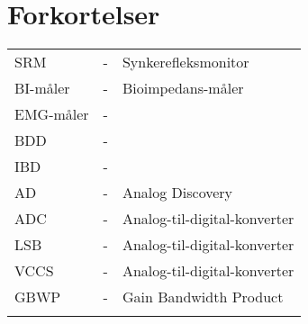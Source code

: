 \chapter{Forkortelser}

\begin{table}[H]
\center
{}
\begin{tabularx}{\linewidth}{l l X}	
SRM         & - &   Synkerefleksmonitor \\ \addlinespace[2mm]
BI-måler         & - &   Bioimpedans-måler \\ \addlinespace[2mm]
EMG-måler   & - &    \\ \addlinespace[2mm]
BDD   & - &    \\ \addlinespace[2mm]
IBD  & - &    \\ \addlinespace[2mm]
AD  & - &  Analog Discovery  \\ \addlinespace[2mm]
ADC  & - &  Analog-til-digital-konverter  \\ \addlinespace[2mm]
LSB  & - &  Analog-til-digital-konverter  \\ \addlinespace[2mm]
VCCS & - &  Analog-til-digital-konverter  \\ \addlinespace[2mm]
GBWP & - &  Gain Bandwidth Product  \\ \addlinespace[2mm]
\end{tabularx}
\end{table}